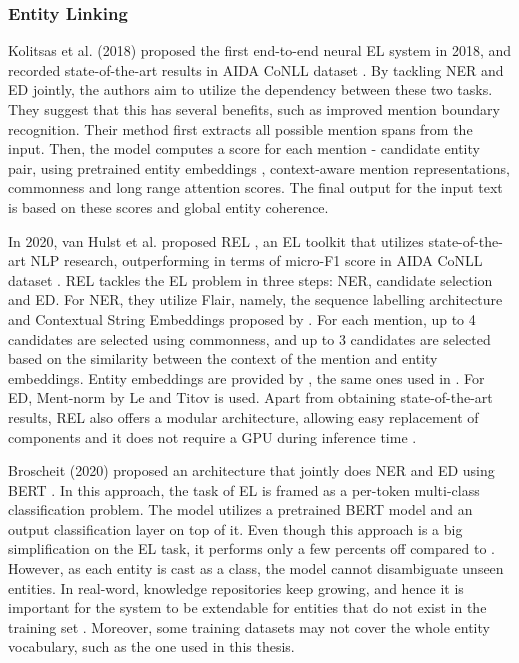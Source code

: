 \documentclass{report}
\theoremstyle{definition}
\theoremstyle{remark}
\begin{document}
\subsubsection{Entity Linking}
Kolitsas et al. (2018) \cite{kolitsas} proposed the first end-to-end neural EL system in 2018, and recorded state-of-the-art results in AIDA CoNLL dataset \cite{CoNLLYago}. By tackling NER and ED jointly, the authors aim to utilize the dependency between these two tasks. They suggest that this has several benefits, such as improved mention boundary recognition. Their method first extracts all possible mention spans from the input. Then, the model computes a score for each mention - candidate entity pair, using pretrained entity embeddings \cite{kolitsasEmbed}, context-aware mention representations, commonness and long range attention scores. The final output for the input text is based on these scores and global entity coherence. 

In 2020, van Hulst et al. proposed REL \cite{REL}, an EL toolkit that utilizes state-of-the-art NLP research, outperforming \cite{kolitsas} in terms of micro-F1 score in AIDA CoNLL dataset \cite{CoNLLYago}. REL tackles the EL problem in three steps: NER, candidate selection and ED. For NER, they utilize Flair, namely, the sequence labelling architecture and Contextual String Embeddings proposed by \cite{flairpaper}. For each mention, up to 4 candidates are selected using commonness, and up to 3 candidates are selected based on the similarity between the context of the mention and entity embeddings. Entity embeddings are provided by \cite{kolitsasEmbed}, the same ones used in \cite{kolitsas}. For ED, Ment-norm by Le and Titov \cite{mentnorm} is used. Apart from obtaining state-of-the-art results, REL also offers a modular architecture, allowing easy replacement of components and it does not require a GPU during inference time \cite{REL}. 

Broscheit (2020) \cite{bertEL} proposed an architecture that jointly does NER and ED using BERT \cite{BERT}. In this approach, the task of EL is framed as a per-token multi-class classification problem. The model utilizes a pretrained BERT model and an output classification layer on top of it. Even though this approach is a big simplification on the EL task, it performs only a few percents off compared to \cite{kolitsas}.  However, as each entity is cast as a class, the model cannot disambiguate unseen entities. In real-word, knowledge repositories keep growing, and hence it is important for the system to be extendable for entities that do not exist in the training set \cite{gupta}. Moreover, some training datasets may not cover the whole entity vocabulary, such as the one used in this thesis.
\end{document}

